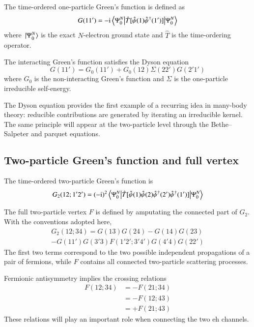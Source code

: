 \documentclass[aip,jcp,reprint,noshowkeys,superscriptaddress]{revtex4-1}
\newcommand{\ii}{\mathrm{i}}
\newcommand{\eh}{\text{eh}}
\begin{document}
The time-ordered one-particle Green's function is defined as
\begin{equation}
	G(11')
	=
	-\ii
	\mel{
		\Psi_0^N
		}{
		\hat{T}
		[
			\hat{\psi}(1)
			\hat{\psi}^{\dagger}(1')
		]
		}{
		\Psi_0^N
	}
	\label{eq:G_def}
\end{equation}
where $\ket*{\Psi_0^N}$ is the exact $N$-electron ground state and
$\hat{T}$ is the time-ordering operator.

The interacting Green's function satisfies the Dyson equation
\begin{equation}
	G(11')
	=
	G_0(11')
	+
	G_0(12)
	\Sigma(22')
	G(2'1')
	\label{eq:Dyson}
\end{equation}
where $G_0$ is the non-interacting Green's function and $\Sigma$ is
the one-particle irreducible self-energy.

The Dyson equation provides the first example of a recurring idea in
many-body theory: reducible contributions are generated by iterating
an irreducible kernel.
The same principle will appear at the two-particle level through the
Bethe--Salpeter and parquet equations.

\subsection{Two-particle Green's function and full vertex}

The time-ordered two-particle Green's function is
\begin{equation}
	\begin{split}
	G_2(12;1'2')
	=
	(-\ii)^2
	\mel{
		\Psi_0^N
		}{
		\hat{T}
		[
			\hat{\psi}(1)
			\hat{\psi}(2)
			\hat{\psi}^{\dagger}(2')
			\hat{\psi}^{\dagger}(1')
		]
		}{
		\Psi_0^N
	}
	\end{split}
	\label{eq:G2_def}
\end{equation}

The full two-particle vertex $F$ is defined by amputating the
connected part of $G_2$.
With the conventions adopted here,
\begin{multline}
	G_2(12;34)
	=
	G(13)G(24)
	-
	G(14)G(23)
	\\
	-
	G(11')
	G(3'3)
	F(1'2';3'4')
	G(4'4)
	G(22')
	\label{eq:G2_F}
\end{multline}
The first two terms correspond to the two possible independent
propagations of a pair of fermions, while $F$ contains all connected
two-particle scattering processes.

Fermionic antisymmetry implies the crossing relations
\begin{equation}
	\begin{split}
	F(12;34)
	&=
	-F(21;34)
	\\
	&=
	-F(12;43)
	\\
	&=
	+F(21;43)
	\end{split}
	\label{eq:F_crossing}
\end{equation}
These relations will play an important role when connecting the two
$\eh$ channels.
\end{document}
